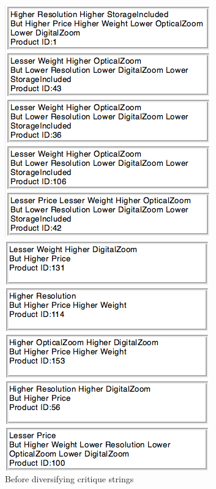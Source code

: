 \begin{figure}
\centering
\begin{minipage}{.45\textwidth}
  \centering
  \includegraphics[width=1\linewidth]{figures-bharath/diversity1.jpg}
  \caption{Before diversifying critique strings}
  \label{fig:beforeDiv}
\end{minipage}%
\;\;\;\;\;\;
\begin{minipage}{.45\textwidth}
  \centering
  \includegraphics[width=1\linewidth]{figures-bharath/diversity2.jpg}

\end{minipage}
\end{figure}
